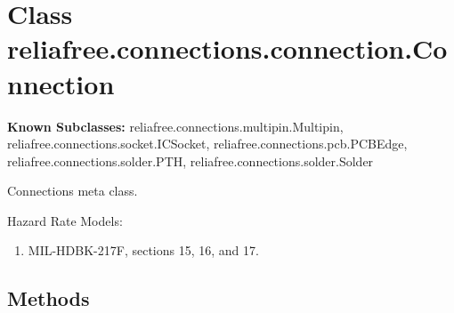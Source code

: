 %
%
%


\section{Class reliafree.connections.connection.Connection}

    \label{reliafree:connections:connection:Connection}
\textbf{Known Subclasses:}
reliafree.connections.multipin.Multipin,
    reliafree.connections.socket.ICSocket,
    reliafree.connections.pcb.PCBEdge,
    reliafree.connections.solder.PTH,
    reliafree.connections.solder.Solder

Connections meta class.

Hazard Rate Models:

\begin{enumerate}

\setlength{\parskip}{0.5ex}
  \item MIL-HDBK-217F, sections 15, 16, and 17.

\end{enumerate}



  \subsection{Methods}

    \label{reliafree:connections:connection:Connection:__init__}

    \vspace{0.5ex}


